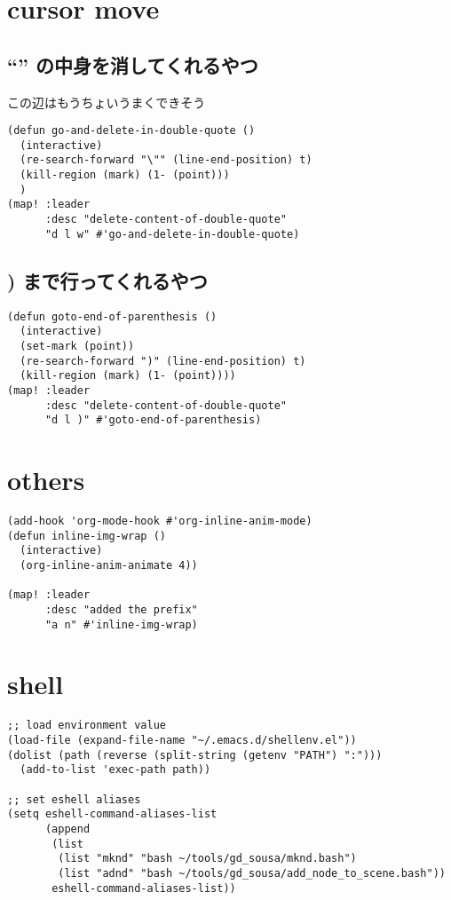 \documentclass[11pt]{article}
\begin{document}
\section{cursor move}
\label{sec:orgdf47412}
\subsection{``'' の中身を消してくれるやつ}
\label{sec:org99598d3}
この辺はもうちょいうまくできそう
\begin{verbatim}
(defun go-and-delete-in-double-quote ()
  (interactive)
  (re-search-forward "\"" (line-end-position) t)
  (kill-region (mark) (1- (point)))
  )
(map! :leader
      :desc "delete-content-of-double-quote"
      "d l w" #'go-and-delete-in-double-quote)
\end{verbatim}
\subsection{) まで行ってくれるやつ}
\label{sec:org8a65fe1}
\begin{verbatim}
(defun goto-end-of-parenthesis ()
  (interactive)
  (set-mark (point))
  (re-search-forward ")" (line-end-position) t)
  (kill-region (mark) (1- (point))))
(map! :leader
      :desc "delete-content-of-double-quote"
      "d l )" #'goto-end-of-parenthesis)
\end{verbatim}
\section{others}
\label{sec:orgac36703}
\begin{verbatim}
(add-hook 'org-mode-hook #'org-inline-anim-mode)
(defun inline-img-wrap ()
  (interactive)
  (org-inline-anim-animate 4))

(map! :leader
      :desc "added the prefix"
      "a n" #'inline-img-wrap)

\end{verbatim}
\section{shell}
\label{sec:org1929c39}
\begin{verbatim}
;; load environment value
(load-file (expand-file-name "~/.emacs.d/shellenv.el"))
(dolist (path (reverse (split-string (getenv "PATH") ":")))
  (add-to-list 'exec-path path))

;; set eshell aliases
(setq eshell-command-aliases-list
      (append
       (list
        (list "mknd" "bash ~/tools/gd_sousa/mknd.bash")
        (list "adnd" "bash ~/tools/gd_sousa/add_node_to_scene.bash"))
       eshell-command-aliases-list))
\end{verbatim}
\end{document}
